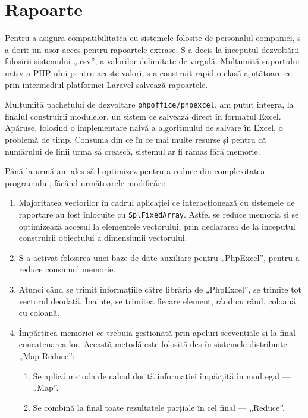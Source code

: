 \section{Rapoarte}

	Pentru a asigura compatibilitatea cu sistemele folosite de personalul companiei, s-a dorit un ușor acces pentru rapoartele extrase.
	S-a decis la începutul dezvoltării folosirii sistemului „.csv”, a valorilor delimitate de virgulă.
	Mulțumită suportului nativ a PHP-ului pentru aceste valori, s-a construit rapid o clasă ajutătoare ce prin intermediul platformei Laravel salvează rapoartele.

	Mulțumită pachetului de dezvoltare \verb|phpoffice/phpexcel|, am putut integra, la finalul construirii modulelor, un sistem ce salvează direct în formatul Excel.
	Apăruse, folosind o implementare naivă a algoritmului de salvare în Excel, o problemă de timp.
	Consuma din ce în ce mai multe resurse și pentru că numărului de linii urma să crească, sistemul ar fi rămas fără memorie.

	Până la urmă am ales să-l optimizez pentru a reduce din complexitatea programului, făcând următoarele modificări:
	\begin{enumerate}
		\item Majoritatea vectorilor în cadrul aplicației ce interacționează cu sistemele de raportare au fost înlocuite cu \verb|SplFixedArray|.
		Astfel se reduce memoria și se optimizează accesul la elementele vectorului, prin declararea de la începutul construirii obiectului a dimensiunii vectorului.
		\item S-a activat folosirea unei baze de date auxiliare pentru „PhpExcel”, pentru a reduce consumul memorie.
		\item Atunci când se trimit informațiile către librăria de „PhpExcel”, se trimite tot vectorul deodată.
		Înainte, se trimitea fiecare element, rând cu rând, coloană cu coloană.
		\item Împărțirea memoriei ce trebuia gestionată prin apeluri secvențiale și la final concatenarea lor.
		Această metodă este folosită des în sistemele distribuite -- „Map-Reduce”:
		\begin{enumerate}
			\item Se aplică metoda de calcul dorită informației împărțită în mod egal --- „Map”.
			\item Se combină la final toate rezultatele parțiale în cel final --- „Reduce”.
		\end{enumerate}
	\end{enumerate}

